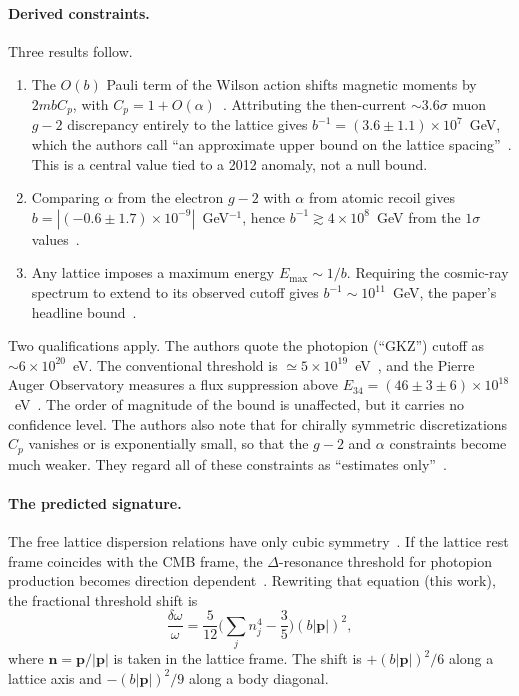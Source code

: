 \paragraph{Derived constraints.}
Three results follow.
\begin{enumerate}
\item The $O(b)$ Pauli term of the Wilson action shifts magnetic moments by $2mbC_p$, with $C_p=1+O(\alpha)$~\cite[eqs.~(3), (5)]{Beane2014constraints}. Attributing the then-current $\sim3.6\sigma$ muon $g-2$ discrepancy entirely to the lattice gives $b^{-1}=(3.6\pm1.1)\times10^{7}$~GeV, which the authors call ``an approximate upper bound on the lattice spacing''~\cite[eq.~(10)]{Beane2014constraints}. This is a central value tied to a 2012 anomaly, not a null bound.
\item Comparing $\alpha$ from the electron $g-2$ with $\alpha$ from atomic recoil gives $b=|(-0.6\pm1.7)\times10^{-9}|$~GeV$^{-1}$, hence $b^{-1}\gtrsim4\times10^{8}$~GeV from the $1\sigma$ values~\cite[eqs.~(12)--(13)]{Beane2014constraints}.
\item Any lattice imposes a maximum energy $E_{\max}\sim1/b$. Requiring the cosmic-ray spectrum to extend to its observed cutoff gives $b^{-1}\sim10^{11}$~GeV, the paper's headline bound~\cite[Sec.~IV]{Beane2014constraints}.
\end{enumerate}
Two qualifications apply. The authors quote the photopion (``GKZ'') cutoff as $\sim6\times10^{20}$~eV. The conventional threshold is $\simeq5\times10^{19}$~eV~\cite{Liberati2013tests}, and the Pierre Auger Observatory measures a flux suppression above $E_{34}=(46\pm3\pm6)\times10^{18}$~eV~\cite{PierreAuger2020features}. The order of magnitude of the bound is unaffected, but it carries no confidence level. The authors also note that for chirally symmetric discretizations $C_p$ vanishes or is exponentially small, so that the $g-2$ and $\alpha$ constraints become much weaker. They regard all of these constraints as ``estimates only''~\cite[Sec.~III]{Beane2014constraints}.

\paragraph{The predicted signature.}
The free lattice dispersion relations have only cubic symmetry~\cite[eqs.~(16)--(17), Fig.~2]{Beane2014constraints}. If the lattice rest frame coincides with the CMB frame, the $\Delta$-resonance threshold for photopion production becomes direction dependent~\cite[eq.~(18)]{Beane2014constraints}. Rewriting that equation (this work), the fractional threshold shift is
\begin{equation}
\frac{\delta\omega}{\omega}=\frac{5}{12}\Big(\sum_{j}n_j^4-\frac{3}{5}\Big)(b|\mathbf p|)^2 ,
\label{eq:lattice-liv:threshold}
\end{equation}
where $\mathbf n=\mathbf p/|\mathbf p|$ is taken in the lattice frame. The shift is $+(b|\mathbf p|)^2/6$ along a lattice axis and $-(b|\mathbf p|)^2/9$ along a body diagonal.

